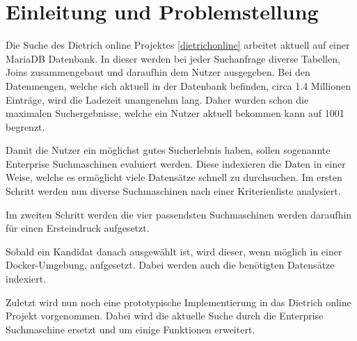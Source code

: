 \chapter{Einleitung und Problemstellung}


Die Suche des Dietrich online Projektes \ref{dietrichonline} arbeitet aktuell auf einer MariaDB Datenbank. In dieser werden bei jeder Suchanfrage diverse Tabellen, Joins zusammengebaut und daraufhin dem Nutzer ausgegeben. Bei den Datenmengen, welche sich aktuell in der Datenbank befinden, circa 1.4 Millionen Einträge, wird die Ladezeit unangenehm lang. Daher wurden schon die maximalen Suchergebnisse, welche ein Nutzer aktuell bekommen kann auf 1001 begrenzt. 

Damit die Nutzer ein möglichst gutes Sucherlebnis haben, sollen sogenannte Enterprise Suchmaschinen evaluiert werden. Diese indexieren die Daten in einer Weise, welche es ermöglicht viele Datensätze schnell zu durchsuchen. Im ersten Schritt werden nun diverse Suchmaschinen nach einer Kriterienliste analysiert.

Im zweiten Schritt werden die vier passendsten Suchmaschinen werden daraufhin für einen Ersteindruck aufgesetzt.

Sobald ein Kandidat danach ausgewählt ist, wird dieser, wenn möglich in einer Docker-Umgebung, aufgesetzt. Dabei werden auch die benötigten Datensätze indexiert.

Zuletzt wird nun noch eine prototypische Implementierung in das Dietrich online Projekt vorgenommen. Dabei wird die aktuelle Suche durch die Enterprise Suchmaschine ersetzt und um einige Funktionen erweitert. 